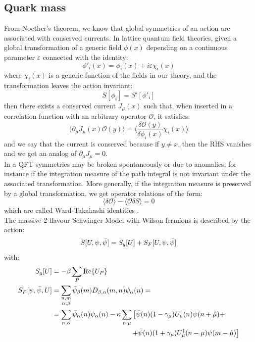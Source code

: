 \subsection{Quark mass}
From Noether's theorem, we know that global symmetries of an action are associated with conserved currents. In lattice quantum field theories, given a global transformation of a generic field $\phi(x)$ depending on a continuous parameter $\varepsilon$ connected with the identity:
\begin{equation}
    \phi'_i(x) = \phi_i(x) + i \varepsilon \chi_i (x) 
\end{equation}
where $\chi_i(x)$ is a generic function of the fields in our theory, and the transformation leaves the action invariant:
\begin{equation}
    S[\phi_i] = S'[\phi'_i]
\end{equation}
then there exists a conserved current $J_\mu(x)$ such that, when inserted in a correlation function with an arbitrary operator $\mathcal{O}$, it satisfies:
\begin{equation}
    \langle \partial_\mu J_\mu (x) \mathcal{O}(y) \rangle = \langle \frac{\delta \mathcal{O}(y)}{\delta \phi_i(x)} \chi_i(x) \rangle
\end{equation}
and we say that the current is conserved because if $y \neq x$, then the RHS vanishes and we get an analog of $\partial_\mu J_\mu = 0$.
\\ In a QFT symmetries may be broken spontaneously or due to anomalies, for instance if the integration measure of the path integral is not invariant under the associated transformation. More generally, if the integration measure is preserved by a global transformation, we get operator relations of the form:
\begin{equation}
    \langle \delta \mathcal{O} \rangle - \langle \mathcal{O} \delta S \rangle = 0
\end{equation}
which are called Ward-Takahashi identities \cite{1950PhRv...78..182W, 1957NCim....6..371T}.
\\ The massive 2-flavour Schwinger Model with Wilson fermions is described by the action:
\begin{equation}
     S[U, \psi, \Bar{\psi}] = S_g[U] + S_F[U, \psi, \Bar{\psi}]
\end{equation}
with:
\begin{equation}
\begin{split}
    S_g[U] & = -\beta \sum_{P} \Re{U_P} \\
    S_F[\psi, \Bar{\psi}, U] & = \sum_{\substack{n, m \\ \alpha, \beta}} \Bar{\psi}_\beta(m) D_{\beta, \alpha}(m, n) \psi_\alpha(n) = \\ & = \sum_{n, \alpha} \Bar{\psi}_\alpha(n) \psi_\alpha(n) - \kappa \sum_{n, \mu} \left[ \Bar{\psi}(n)(1 - \gamma_\mu) U_\mu(n) \psi(n+\hat{\mu}) + \right. \\ & \hspace{40mm} \left. + \Bar{\psi}(n)(1 + \gamma_\mu) U_\mu^\dagger (n - \mu) \psi(m - \hat{\mu}) \right]
\end{split}
\end{equation}
